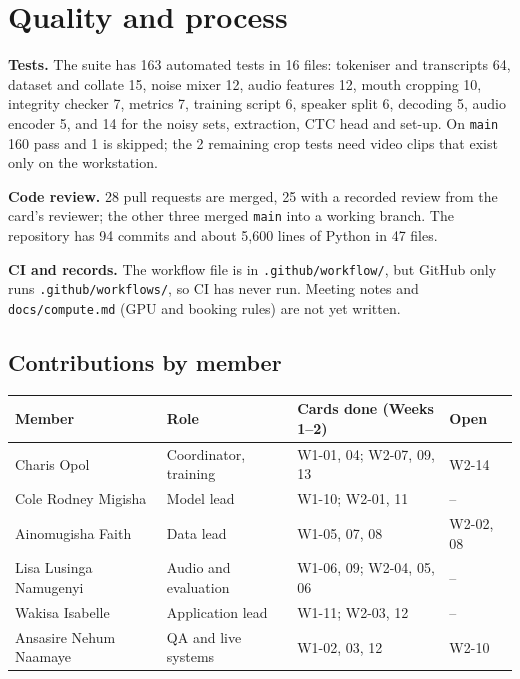 \documentclass[11pt,a4paper]{article}
\newcommand{\code}[1]{\texttt{\small #1}}
\begin{document}
\section{Quality and process}

\textbf{Tests.} The suite has 163 automated tests in 16 files: tokeniser and
transcripts 64, dataset and collate 15, noise mixer 12, audio features 12,
mouth cropping 10, integrity checker 7, metrics 7, training script 6, speaker
split 6, decoding 5, audio encoder 5, and 14 for the noisy sets, extraction, CTC
head and set-up. On \code{main} 160 pass and 1 is skipped; the 2 remaining crop
tests need video clips that exist only on the workstation.

\textbf{Code review.} 28 pull requests are merged, 25 with a recorded review
from the card's reviewer; the other three merged \code{main} into a working
branch. The repository has 94 commits and about 5,600 lines of Python in 47
files.

\textbf{CI and records.} The workflow file is in \code{.github/workflow/}, but
GitHub only runs \code{.github/workflows/}, so CI has never run. Meeting notes
and \code{docs/compute.md} (GPU and booking rules) are not yet written.

\subsection{Contributions by member}
{\footnotesize
{}
\begin{tabularx}{\textwidth}{@{}L{4.0cm}L{3.3cm}XL{2.0cm}@{}}
\toprule
{}\sffamily\bfseries Member & \sffamily\bfseries Role & \sffamily\bfseries Cards done (Weeks 1--2) & \sffamily\bfseries Open \\
\midrule
Charis Opol & Coordinator, training & W1-01, 04; W2-07, 09, 13 & W2-14 \\
Cole Rodney Migisha & Model lead & W1-10; W2-01, 11 & -- \\
Ainomugisha Faith & Data lead & W1-05, 07, 08 & W2-02, 08 \\
Lisa Lusinga Namugenyi & Audio and evaluation & W1-06, 09; W2-04, 05, 06 & -- \\
Wakisa Isabelle & Application lead & W1-11; W2-03, 12 & -- \\
Ansasire Nehum Naamaye & QA and live systems & W1-02, 03, 12 & W2-10 \\
\bottomrule
\end{tabularx}
}
\end{document}
